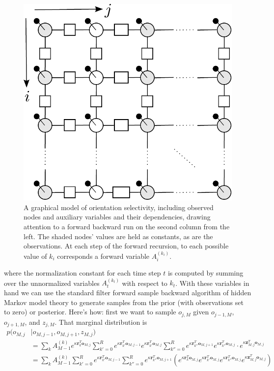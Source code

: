 \documentclass[11pt]{article}
\begin{document}
\begin{figure}[h]
\centering
\includegraphics[scale=0.55]{../fig/col_grid_gm_factors}
\caption{A graphical model of orientation selectivity, including observed nodes and auxiliary variables and their dependencies, drawing attention to a forward backward run on the second column from the left. The shaded nodes' values are held as constants, as are the observations. At each step of the forward recursion, to each possible value of $k_i$ corresponds a forward variable $A_i^{(k_i)}$.}
\label{fig:som_gm3}
\end{figure}

\noindent where the normalization constant for each time step $t$ is computed by summing over the unnormalized variables $A_t^{(k_t)}$ with respect to $k_t$.  With these variables in hand we can use the standard filter forward sample backward algorithm of hidden Markov model theory to generate samples from the prior (with observations set to zero) or posterior. Here's how: first we want to sample $o_{j,M}$ given $o_{j-1,M}$, $o_{j+1,M}$, and $z_{j,M}$. That marginal distribution is 
%
\begin{align*}
	p(o_{M,j}&|o_{M,j-1},o_{M,j+1},z_{M,j}) \\
	&=\sum_k A_{M-1}^{(k)} e^{\kappa\mathbf{r}_k^T\mathbf{o}_{M,j}}\sum_{k'=0}^R e^{\kappa \mathbf{r}_{k'}^T \mathbf{o}_{M,j-1}} e^{\kappa \mathbf{r}_{k'}^T\mathbf{o}_{M,j}} \sum_{k''=0}^R e^{\kappa \mathbf{r}_{k''}^T \mathbf{o}_{M,j+1}} e^{\kappa \mathbf{r}_{k''}^T\mathbf{o}_{M,j}} \cdot e^{\kappa \mathbf{z}_{M,j}^T \mathbf{o}_{M,j}} \\
	&=\sum_k A_{M-1}^{(k)} \sum_{k'=0}^R e^{\kappa \mathbf{r}_{k'}^T \mathbf{o}_{M,j-1}} \sum_{k''=0}^R e^{\kappa \mathbf{r}_{k''}^T \mathbf{o}_{M,j+1}}\left( e^{\kappa\mathbf{r}_k^T\mathbf{o}_{M,j}} e^{\kappa \mathbf{r}_{k'}^T\mathbf{o}_{M,j}} e^{\kappa \mathbf{r}_{k''}^T\mathbf{o}_{M,j}} e^{\kappa \mathbf{z}_{M,j}^T \mathbf{o}_{M,j}}\right) 
\end{align*}
\end{document}

